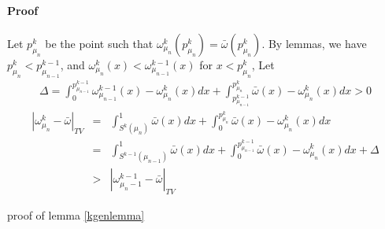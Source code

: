 \documentclass{article}
\begin{document}
\paragraph{Proof}
Let $p_{\mu_n}^k$ be the point such that $\omega_{\mu_n}^k(p_{\mu_n}^k) = \bar{\omega}(p_{\mu_n}^k)$. By lemmas, we have  $p_{\mu_n}^k < p_{\mu_{n-1}}^{k-1}$, and $\omega_{\mu_n}^k(x)< \omega_{\mu_{n-1}}^{k-1}(x)$ for $x< p_{\mu_n}^k $, Let
 \begin{eqnarray}
  \Delta =  \int_0^{p_{\mu_{n-1}}^{k-1}} \omega_{\mu_{n-1}}^{k-1}(x) -\omega_{\mu_n}^k(x) dx
            +\int_{p_{\mu_{n-1}}^{k-1}}^{p_{\mu_n}^k} \bar{\omega}(x) - \omega_{\mu_n}^k(x) dx >0
 \end{eqnarray} 
 \begin{eqnarray}
    |\omega_{\mu_n}^k - \bar{\omega}|_{TV} 
                & = & \int_{S^k(\mu_n)}^1  \bar{\omega}(x) dx +
                      \int_0^{p_{\mu_n}^k} \bar{\omega}(x) - \omega_{\mu_n}^k(x)dx \nonumber\\  
                & = & \int_{S^{k-1}(\mu_{n-1})}^1  \bar{\omega}(x) dx +
                      \int_0^{p_{\mu_{n-1}}^{k-1}} \bar{\omega}(x) - \omega_{\mu_n}^k(x)dx + \Delta \nonumber\\
                & > & |\omega_{\mu_n-1}^{k-1} - \bar{\omega}|_{TV}
 \end{eqnarray}

proof of lemma \ref{kgenlemma}
\end{document}
